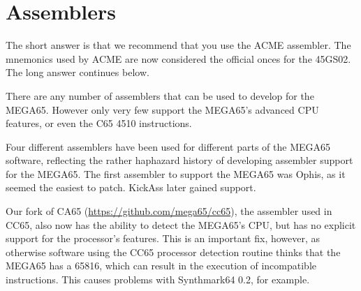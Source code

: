 \chapter{Assemblers}

The short answer is that we recommend that you use the ACME
assembler.  The mnemonics used by ACME are now considered the official
onces for the 45GS02.  The long answer continues below.

There are any number of assemblers that can be used to develop for the
MEGA65.  However only very few support the MEGA65's advanced CPU
features, or even the C65 4510 instructions.

Four different
assemblers have been used for different parts of the MEGA65 software,
reflecting the rather haphazard history of developing assembler
support for the MEGA65.  The first assembler to support the MEGA65 was
Ophis, as it seemed the easiest to patch.  KickAss later gained
support.

Our fork of CA65 (\url{https://github.com/mega65/cc65}), the assembler
used in CC65, also now has the ability 
to detect the MEGA65's CPU, but has no explicit support for the
processor's features.  This is an important fix, however, as otherwise
software using the CC65 processor detection routine thinks that the
MEGA65 has a 65816, which can result in the execution of incompatible
instructions. This causes problems with Synthmark64 0.2, for example.
